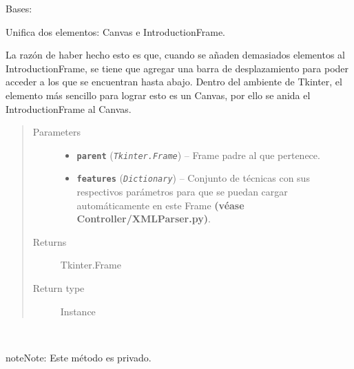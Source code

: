 \documentclass[letterpaper,10pt,english]{sphinxmanual}
\begin{document}
\begin{fulllineitems}
\label{View/Main/Home/HomeFrame:View.Main.Home.HomeFrame.HomeFrame}
Bases: 

\begin{DUlineblock}{0em}
\item[] Unifica dos elementos: Canvas e IntroductionFrame.
\item[] La razón de haber hecho esto es que, cuando se añaden demasiados elementos al
IntroductionFrame, se tiene que agregar una barra de desplazamiento para poder
acceder a los que se encuentran hasta abajo. Dentro del ambiente de Tkinter, el
elemento más sencillo para lograr esto es un Canvas, por ello se anida el
IntroductionFrame al Canvas.
\end{DUlineblock}
\begin{quote}\begin{description}
\item[{Parameters}] \leavevmode\begin{itemize}
\item {} 
\textbf{\texttt{parent}} (\emph{\texttt{Tkinter.Frame}}) -- Frame padre al que pertenece.

\item {} 
\textbf{\texttt{features}} (\emph{\texttt{Dictionary}}) -- Conjunto de técnicas con sus respectivos parámetros para que
se puedan cargar automáticamente en este Frame \textbf{(véase
Controller/XMLParser.py)}.

\end{itemize}

\item[{Returns}] \leavevmode
Tkinter.Frame

\item[{Return type}] \leavevmode
Instance

\end{description}\end{quote}

\begin{fulllineitems}
\label{View/Main/Home/HomeFrame:View.Main.Home.HomeFrame.HomeFrame._HomeFrame__update_scrollbar}~
\begin{notice}{note}{Note:}
Este método es privado.
\end{notice}


\end{fulllineitems}
\end{fulllineitems}
\end{document}
